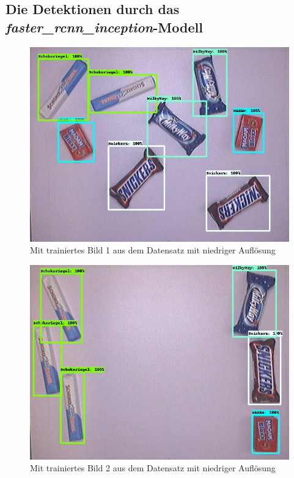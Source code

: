     \subsection{Die Detektionen durch das \textit{faster\_rcnn\_inception}-Modell}
    
    \begin{figure}[H]
        \vspace{-5mm}
        \centering
        \includegraphics[angle = 90, height = 0.85\textheight]{Bilder/models/model_comparison/faster_rcnn_inception_resnet_v2_640x640_coco17_tpu-8/trained_1.jpg}
        \caption{Mit trainiertes Bild 1 aus dem Datensatz mit niedriger Auflösung}
    \end{figure}
    
    \begin{figure}[H]
        \centering
        \includegraphics[angle = 90, width = \textwidth]{Bilder/models/model_comparison/faster_rcnn_inception_resnet_v2_640x640_coco17_tpu-8/trained_2.jpg}
        \caption{Mit trainiertes Bild 2 aus dem Datensatz mit niedriger Auflösung}
    \end{figure}
    

